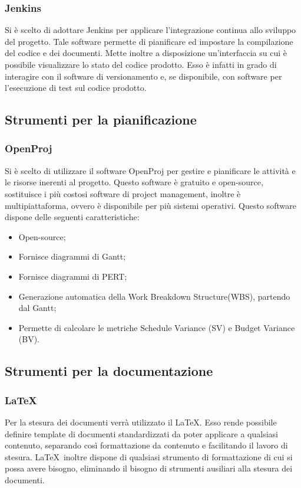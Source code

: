 \subsubsection{Jenkins}
\label{}
Si è scelto di adottare Jenkins per applicare l’integrazione continua allo sviluppo del progetto.
Tale software permette di pianificare ed impostare la compilazione del codice e dei documenti. 
Mette inoltre a disposizione un'interfaccia su cui è possibile visualizzare lo stato del codice prodotto. 
Esso è infatti in grado di interagire con il software di versionamento e, se disponibile, con software per l’esecuzione di test sul codice prodotto.



\subsection{Strumenti per la pianificazione}
\label{}
\subsubsection{OpenProj}
Si è scelto di utilizzare il software OpenProj per gestire e pianificare le attività e le risorse inerenti al progetto.
Questo software è gratuito e open-source, sostituisce i più costosi software di project management, inoltre è multipiattaforma, ovvero è disponibile per più sistemi operativi.
Questo software dispone delle seguenti caratteristiche:
\begin{itemize}
\item Open-source;
\item Fornisce diagrammi di Gantt;
\item Fornisce diagrammi di PERT;
\item Generazione automatica della Work Breakdown Structure(WBS), partendo dal Gantt;
\item Permette di calcolare le metriche Schedule Variance (SV) e Budget Variance (BV).
\end{itemize}
\label{}


\subsection{Strumenti per la documentazione}
\label{}
\subsubsection{LaTeX}
\label{5.7}
Per la stesura dei documenti verrà utilizzato il  \LaTeX. Esso rende possibile definire template di documenti standardizzati da poter applicare a qualsiasi contenuto, separando così formattazione da contenuto e facilitando il lavoro di stesura. \LaTeX\ inoltre dispone di qualsiasi strumento di formattazione di cui si possa avere bisogno, eliminando il bisogno di strumenti ausiliari alla stesura dei documenti.

